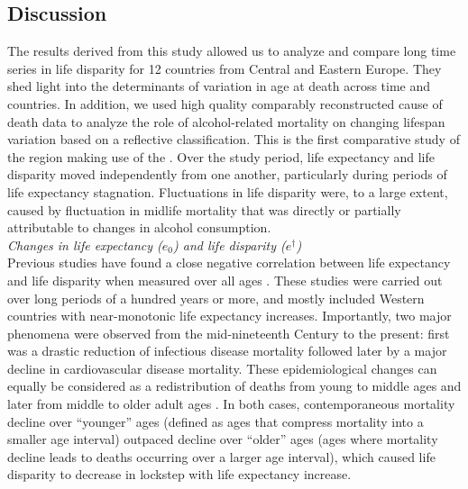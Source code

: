 \documentclass{article}
\begin{document}
\begin{spacing}{1.5}
\section*{Discussion}
The results derived from this study allowed us to analyze and compare long time series in life disparity for 12 countries from Central and Eastern Europe. They shed light into the determinants of variation in age at death across time and countries. In addition, we used high quality comparably reconstructed cause of death data to analyze the role of alcohol-related mortality on changing lifespan variation based on a reflective classification. This is the first comparative study of the region making use of the \citet{HcO}. Over the study period, life expectancy and life disparity moved independently from one another, particularly during periods of life expectancy stagnation. Fluctuations in life disparity were, to a large extent, caused by fluctuation in midlife mortality that was directly or partially attributable to changes in alcohol consumption. \\
 
\emph{Changes in life expectancy ($e_0$) and life disparity ($e^\dagger$)}\\

Previous studies have found a close negative correlation between life expectancy and life disparity when measured over all ages  \citep{ wilmoth1999,vaupel2011,colchero2016emergence}. These studies were carried out over long periods of a hundred years or more, and mostly included Western countries with near-monotonic life expectancy increases. Importantly, two major phenomena were observed from the mid-nineteenth Century to the present: first was a drastic reduction of infectious disease mortality followed later by a major decline in cardiovascular disease mortality. These epidemiological changes can equally be considered as a redistribution of deaths from young to middle ages and later from middle to older adult ages \citep{robine2001redefining}. In both cases, contemporaneous mortality decline over ``younger'' ages (defined as ages that compress mortality into a smaller age interval) outpaced decline over ``older'' ages (ages where mortality decline leads to deaths occurring over a larger age interval), which caused life disparity to decrease in lockstep with life expectancy increase.\\


\end{spacing}
\end{document}
